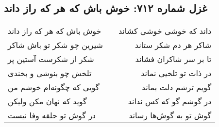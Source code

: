 \begin{center}
\section*{غزل شماره ۷۱۲: خوش باش که هر که راز داند}
\label{sec:0712}
\begin{longtable}{l p{0.5cm} r}
خوش باش که هر که راز داند
&&
داند که خوشی خوشی کشاند
\\
شیرین چو شکر تو باش شاکر
&&
شاکر هر دم شکر ستاند
\\
شکر از شکرست آستین پر
&&
تا بر سر شاکران فشاند
\\
تلخش چو بنوشی و بخندی
&&
در ذات تو تلخیی نماند
\\
گویی که چگونه‌ام خوشم من
&&
گویم ترشم دلت بماند
\\
گوید که نهان مکن ولیکن
&&
در گوشم گو که کس نداند
\\
در گوش تو حلقه وفا نیست
&&
گوش تو به گوش‌ها رساند
\\
\end{longtable}
\end{center}
